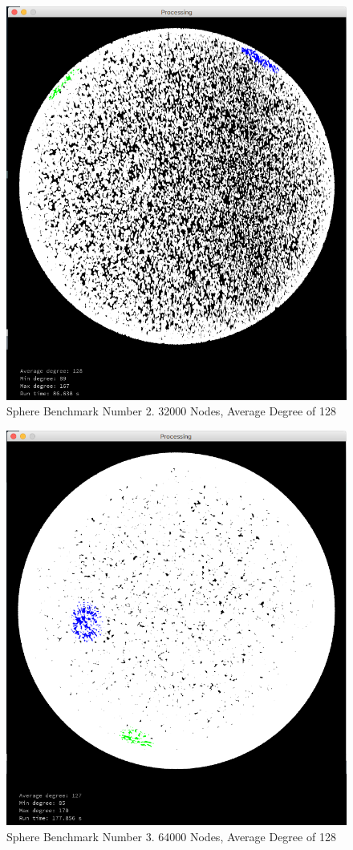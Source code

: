 \documentclass{article}
\begin{document}
\begin{center}
    \begin{figure}
        \includegraphics[scale=0.45]{./images/sphere_1.png}
        \caption{Sphere Benchmark Number 2. 32000 Nodes, Average Degree of 128}
        \label{sphere1}
    \end{figure}
\end{center}

\begin{center}
    \begin{figure}
        \includegraphics[scale=0.45]{./images/sphere_2.png}
        \caption{Sphere Benchmark Number 3. 64000 Nodes, Average Degree of 128}
        \label{sphere2}
    \end{figure}
\end{center}
\end{document}
